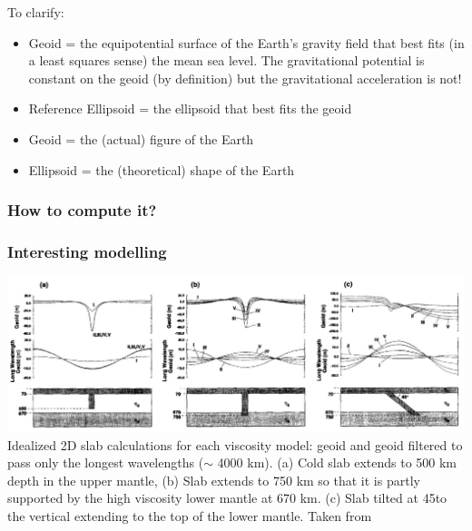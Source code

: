 To clarify:
\begin{itemize}
\item Geoid = the equipotential surface of the Earth’s gravity field that
best fits (in a least squares sense) the mean sea level.
The gravitational potential is constant on the geoid (by definition) but 
the gravitational acceleration is not! 

\item Reference Ellipsoid = the ellipsoid that best fits the geoid 
\item Geoid = the (actual) figure of the Earth 
\item Ellipsoid = the (theoretical) shape of the Earth
\end{itemize}



\subsubsection{How to compute it?}

\subsubsection{Interesting modelling}

\begin{center}
\includegraphics[width=15cm]{images/geoid/mogu96}
{\scriptsize Idealized 2D slab calculations for each viscosity model: geoid and geoid filtered 
to pass only the longest wavelengths ($\sim$ 4000 km).
(a) Cold slab extends to 500 km depth in the upper mantle, 
(b) Slab extends to 750 km so that it is partly supported by the high viscosity lower mantle at 670 km. 
(c) Slab tilted at 45\degree to the vertical extending to the top of the lower mantle. 
Taken from \cite{mogu96}}
\end{center}
